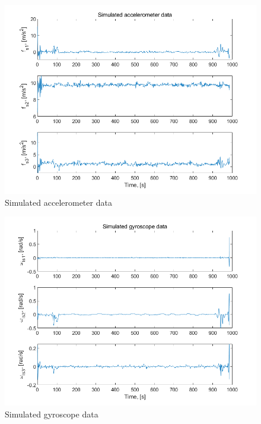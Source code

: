 \documentclass[conference]{IEEEtran}
\begin{document}
\begin{figure}[htbp]
    \centerline{\includegraphics[width=1.0\columnwidth]{fig3.png}}
    \caption{Simulated accelerometer data}
\end{figure}

\begin{figure}[htbp]
    \centerline{\includegraphics[width=1.0\columnwidth]{fig4.png}}
    \caption{Simulated gyroscope data}
\end{figure}
\end{document}
